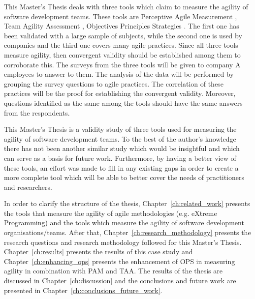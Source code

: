 This Master's Thesis deals with three tools which claim to measure the agility of software development teams. These tools are Perceptive Agile Measurement \cite{pam}, Team Agility Assessment \cite{Leffingwell}, Objectives Principles Strategies \cite{sventha_dissertation}. The first one has been validated with a large sample of subjects, while the second one is used by companies and the third one covers many agile practices. Since all three tools measure agility, then convergent validity should be established among them to corroborate this. The surveys from the three tools will be given to company A employees to answer to them. The analysis of the data will be performed by grouping the survey questions to agile practices. The correlation of these practices will be the proof for establishing the convergent validity. Moreover, questions identified as the same among the tools should have the same answers from the respondents.

This Master's Thesis is a validity study of three tools used for measuring the agility of software development teams. To the best of the author's knowledge there has not been another similar study which would be insightful and which can serve as a basis for future work. Furthermore, by having a better view of these tools, an effort was made to fill in any existing gaps in order to create a more complete tool which will be able to better cover the needs of practitioners and researchers. 

In order to clarify the structure of the thesis,  Chapter~\ref{ch:related_work} presents the tools that measure the agility of agile methodologies (e.g. eXtreme Programming) and the tools which measure the agility of software development organisations/teams. After that, Chapter~\ref{ch:research_methodology} presents the research questions and research methodology followed for this Master's Thesis. Chapter~\ref{ch:results} presents the results of this case study and Chapter~\ref{ch:enhancing_ops} presents the enhancement of \ac{OPS} in measuring agility in combination with \ac{PAM} and \ac{TAA}. The results of the thesis are discussed in Chapter~\ref{ch:discussion} and the conclusions and future work are presented in Chapter~\ref{ch:conclusions_future_work}.  